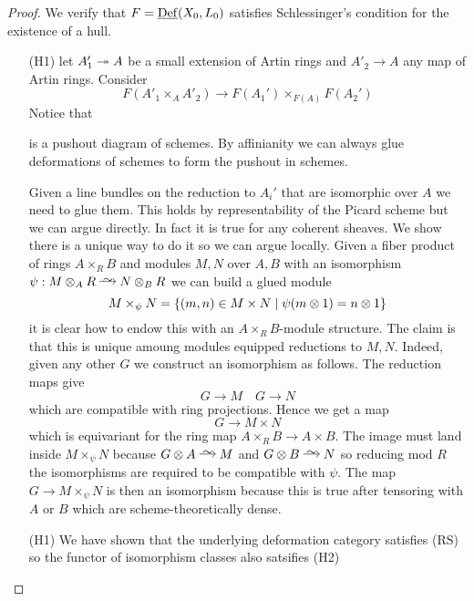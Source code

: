 \documentclass[12pt]{article}
\newcommand{\Def}{\mathrm{Def}}
\begin{document}
\begin{proof}
We verify that $F = \ul{\Def}(X_0, L_0)$ satisfies Schlessinger's condition for the existence of a hull. 
\begin{enumerate}
\item[(H1)] let $A'_1 \twoheadrightarrow A$ be a small extension of Artin rings and $A'_2 \to A$ any map of Artin rings. Consider
\[ F(A'_1 \times_A A'_2) \to F(A_1') \times_{F(A)} F(A_2') \]
Notice that
\begin{center}
\end{center} 
is a pushout diagram of schemes. By affinianity we can always glue deformations of schemes to form the pushout in schemes. 

Given a line bundles on the reduction to $A_i'$ that are isomorphic over $A$ we need to glue them. This holds by representability of the Picard scheme but we can argue directly. In fact it is true for any coherent sheaves. We show there is a unique way to do it so we can argue locally. Given a fiber product of rings $A \times_R B$ and modules $M, N$ over $A,B$ with an isomorphism $\psi : M \ot_A R \iso N \ot_B R$ we can build a glued module
\[ M \times_\psi N = \{ (m,n) \in M \times N \mid \psi(m \otimes 1) = n \otimes 1 \} \]
it is clear how to endow this with an $A \times_R B$-module structure. The claim is that this is unique amoung modules equipped reductions to $M, N$. Indeed, given any other $G$ we construct an isomorphism as follows. The reduction maps give
\[ G \to M \quad G \to N \]
which are compatible with ring projections. Hence we get a map
\[ G \to M \times N \]
which is equivariant for the ring map $A \times_R B \to A \times B$. The image must land inside $M \times_{\psi} N$ because $G \ot A \iso M$ and $G \ot B \iso N$ so reducing mod $R$ the isomorphisms are required to be compatible with $\psi$. The map $G \to M \times_{\psi} N$ is then an isomorphism because this is true after tensoring with $A$ or $B$ which are scheme-theoretically dense.

\item[(H1)] We have shown that the underlying deformation category satisfies (RS) so the functor of isomorphism classes also satsifies (H2)


\end{enumerate}
\end{proof}
\end{document}
